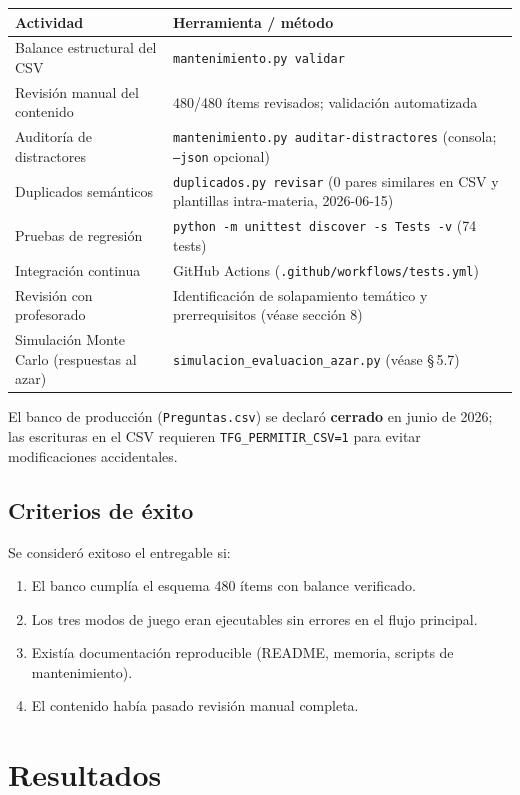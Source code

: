 \documentclass[11pt,a4paper]{article}
\newcommand{\iniciotabla}{\par\medskip\renewcommand{\arraystretch}{1.12}}
\newcommand{\fintabla}{\par\medskip}
\begin{document}
\iniciotabla
\begin{tabular}{@{}lp{8cm}@{}}
\toprule
\textbf{Actividad} & \textbf{Herramienta / método} \\
\midrule
Balance estructural del CSV & \texttt{mantenimiento.py validar} \\
Revisión manual del contenido & 480/480 ítems revisados; validación automatizada \\
Auditoría de distractores & \texttt{mantenimiento.py auditar-distractores} (consola; \texttt{--json} opcional) \\
Duplicados semánticos & \texttt{duplicados.py revisar} (0 pares similares en CSV y plantillas intra-materia, 2026-06-15) \\
Pruebas de regresión & \texttt{python -m unittest discover -s Tests -v} (74 tests) \\
Integración continua & GitHub Actions (\texttt{.github/workflows/tests.yml}) \\
Revisión con profesorado & Identificación de solapamiento temático y prerrequisitos (véase sección 8) \\
Simulación Monte Carlo (respuestas al azar) & \texttt{simulacion\_evaluacion\_azar.py} (véase \S\,5.7) \\
\bottomrule
\end{tabular}
\fintabla

El banco de producción (\texttt{Preguntas.csv}) se declaró \textbf{cerrado} en junio de 2026; las escrituras en el CSV requieren \texttt{TFG\_PERMITIR\_CSV=1} para evitar modificaciones accidentales.

\subsection{Criterios de éxito}

Se consideró exitoso el entregable si:
\begin{enumerate}
  \item El banco cumplía el esquema 480 ítems con balance verificado.
  \item Los tres modos de juego eran ejecutables sin errores en el flujo principal.
  \item Existía documentación reproducible (README, memoria, scripts de mantenimiento).
  \item El contenido había pasado revisión manual completa.
\end{enumerate}

\section{Resultados}
\end{document}
